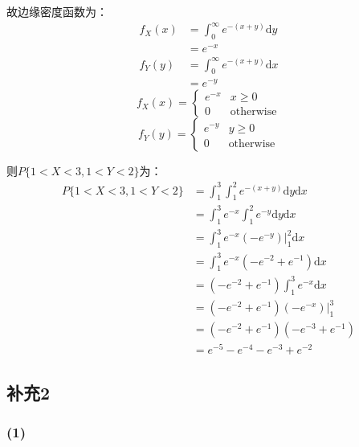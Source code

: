\documentclass[a4paper,12pt]{ctexart}
\begin{document}
故边缘密度函数为：
\begin{align*}
	f_X(x) &= \int_0^{\infty} e^{-(x+y)} \mathrm{d}y \\
	&= e^{-x} \\
	f_Y(y) &= \int_0^{\infty} e^{-(x+y)} \mathrm{d}x \\
	&= e^{-y}
\end{align*}
\begin{equation*}
	f_X(x) = 
	\begin{cases}
		e^{-x} & x \geq 0 \\
		0 & \text{otherwise}
	\end{cases}
\end{equation*}
\begin{equation*}
	f_Y(y) = 
	\begin{cases}
		e^{-y} & y \geq 0 \\
		0 & \text{otherwise}
	\end{cases}
\end{equation*}

则$P\{1 < X < 3, 1 < Y < 2\}$为：
\begin{align*}
	P\{1 < X < 3, 1 < Y < 2\} &= \int_{1}^{3} \int_{1}^{2} e^{-(x+y)} \mathrm{d}y \mathrm{d}x \\
	&= \int_{1}^{3} e^{-x} \int_{1}^{2} e^{-y} \mathrm{d}y \mathrm{d}x \\
	&= \int_{1}^{3} e^{-x} \left( -e^{-y} \right) \Big|_1^2 \mathrm{d}x \\
	&= \int_{1}^{3} e^{-x} \left( -e^{-2} + e^{-1} \right) \mathrm{d}x \\
	&= \left( -e^{-2} + e^{-1} \right) \int_{1}^{3} e^{-x} \mathrm{d}x \\
	&= \left( -e^{-2} + e^{-1} \right) \left( -e^{-x} \right) \Big|_1^3 \\
	&= \left( -e^{-2} + e^{-1} \right) \left( -e^{-3} + e^{-1} \right) \\
	&= e^{-5} - e^{-4} - e^{-3} + e^{-2}
\end{align*}

\subsection*{补充2}

\subsubsection*{(1)}
\end{document}
